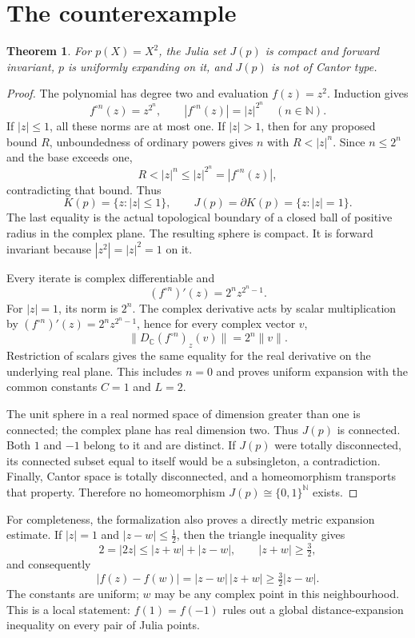 \documentclass[11pt]{article}
\newtheorem{theorem}{Theorem}
\newcommand{\C}{\mathbb C}
\newcommand{\N}{\mathbb N}
\newcommand{\J}{J}
\newcommand{\K}{K}
\begin{document}
\section{The counterexample}
\begin{theorem}
For $p(X)=X^2$, the Julia set $\J(p)$ is compact and forward invariant,
$p$ is uniformly expanding on it, and $\J(p)$ is not of Cantor type.
\end{theorem}
\begin{proof}
The polynomial has degree two and evaluation $f(z)=z^2$. Induction gives
\[
 f^{\circ n}(z)=z^{2^n},\qquad |f^{\circ n}(z)|=|z|^{2^n}
 \quad(n\in\N).
\]
If $|z|\le1$, all these norms are at most one. If $|z|>1$, then for any
proposed bound $R$, unboundedness of ordinary powers gives $n$ with
$R<|z|^n$. Since $n\le2^n$ and the base exceeds one,
\[
 R<|z|^n\le |z|^{2^n}=|f^{\circ n}(z)|,
\]
contradicting that bound. Thus
\[
 \K(p)=\{z:|z|\le1\},\qquad
 \J(p)=\partial\K(p)=\{z:|z|=1\}.
\]
The last equality is the actual topological boundary of a closed ball of
positive radius in the complex plane. The resulting sphere is compact.
It is forward invariant because $|z^2|=|z|^2=1$ on it.

Every iterate is complex differentiable and
\[
 (f^{\circ n})'(z)=2^n z^{2^n-1}.
\]
For $|z|=1$, its norm is $2^n$. The complex derivative acts by scalar
multiplication by $(f^{\circ n})'(z)=2^n z^{2^n-1}$, hence for every complex vector $v$,
\[
 \|D_{\C}(f^{\circ n})_z(v)\|=2^n\|v\|.
\]
Restriction of scalars gives the same equality for the real derivative on
the underlying real plane. This includes $n=0$ and proves uniform expansion
with the common constants $C=1$ and $L=2$.

The unit sphere in a real normed space of dimension greater than one is
connected; the complex plane has real dimension two. Thus $\J(p)$ is
connected. Both $1$ and $-1$ belong to it and are distinct. If $\J(p)$ were
totally disconnected, its connected subset equal to itself would be a
subsingleton, a contradiction. Finally, Cantor space is totally disconnected,
and a homeomorphism transports that property. Therefore no homeomorphism
$\J(p)\cong\{0,1\}^{\N}$ exists.
\end{proof}

For completeness, the formalization also proves a directly metric expansion
estimate. If $|z|=1$ and $|z-w|\le\tfrac12$, then the triangle inequality gives
\[
 2=|2z|\le |z+w|+|z-w|,\qquad |z+w|\ge\tfrac32,
\]
and consequently
\[
 |f(z)-f(w)|=|z-w|\,|z+w|\ge\tfrac32|z-w|.
\]
The constants are uniform; $w$ may be any complex point in this neighbourhood.
This is a local statement: $f(1)=f(-1)$ rules out a global distance-expansion
inequality on every pair of Julia points.
\end{document}
